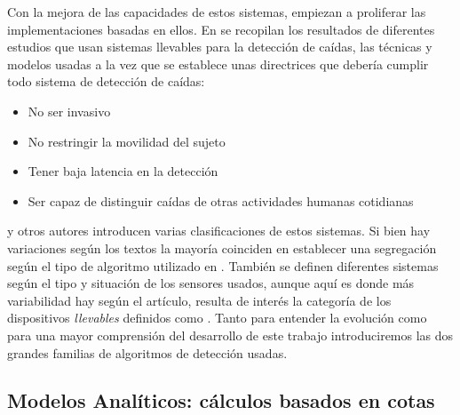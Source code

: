 Con la mejora de las capacidades de estos sistemas, empiezan a proliferar las implementaciones basadas en ellos. En  se recopilan los resultados de diferentes estudios que usan sistemas llevables para la detección de caídas,  las técnicas y modelos usadas a la vez que se establece unas directrices que debería cumplir todo sistema de detección de caídas:
\begin{itemize}
  \item No ser invasivo
  \item No restringir la movilidad del sujeto
  \item Tener baja latencia en la detección
  \item Ser capaz de distinguir caídas de otras actividades humanas cotidianas
\end{itemize}
 y otros autores \cite{Musci2020,Lim2014} introducen varias clasificaciones de estos sistemas. Si bien hay variaciones según los textos la mayoría coinciden en establecer una segregación según el tipo de algoritmo utilizado en . También se definen diferentes sistemas según el tipo y situación de los sensores usados, aunque aquí es donde más variabilidad hay según el artículo, resulta de interés la categoría de los dispositivos \textit{llevables} definidos como . Tanto para entender la evolución como para una mayor comprensión del desarrollo de este trabajo introduciremos las dos grandes familias de algoritmos de detección usadas.

\subsection{Modelos Analíticos: cálculos basados en cotas}\label{sec:arte:modelos_analiticos}

